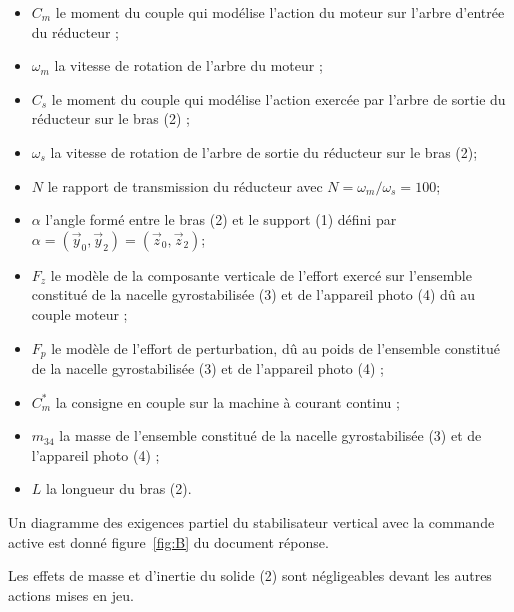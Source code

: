 \begin{itemize}
  \item $C_{m}$ le moment du couple qui modélise l'action du moteur sur l'arbre d'entrée du réducteur ;
  \item $\omega_{m}$ la vitesse de rotation de l'arbre du moteur ;
  \item $C_{s}$ le moment du couple qui modélise l'action exercée par l'arbre de sortie du réducteur sur le bras (2) ;
  \item $\omega_{s}$ la vitesse de rotation de l'arbre de sortie du réducteur sur le bras (2);
  \item $N$ le rapport de transmission du réducteur avec $N=\omega_{m} / \omega_{s}=100$;
  \item $\alpha$ l'angle formé entre le bras (2) et le support (1) défini par $\alpha=\left(\vec{y}_{0}, \vec{y}_{2}\right)=\left(\vec{z}_{0}, \vec{z}_{2}\right)$;
  \item $F_{z}$ le modèle de la composante verticale de l'effort exercé sur l'ensemble constitué de la nacelle gyrostabilisée (3) et de l'appareil photo (4) dû au couple moteur ;
  \item $F_{p}$ le modèle de l'effort de perturbation, dû au poids de l'ensemble constitué de la nacelle gyrostabilisée (3) et de l'appareil photo (4) ;
  \item $C_{m}^{*}$ la consigne en couple sur la machine à courant continu ;
  \item $m_{34}$ la masse de l'ensemble constitué de la nacelle gyrostabilisée (3) et de l'appareil photo (4) ;
  \item $L$ la longueur du bras (2).
\end{itemize}

Un diagramme des exigences partiel du stabilisateur vertical avec la commande active est donné figure~\ref{fig:B} du document réponse.

Les effets de masse et d'inertie du solide (2) sont négligeables devant les autres actions mises en jeu.
\fi




